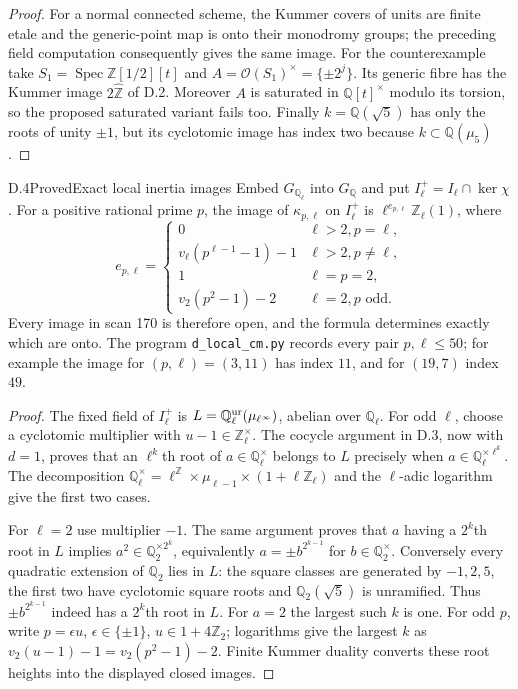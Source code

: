 \begin{proof}
For a normal connected scheme, the Kummer covers of units are finite etale and the generic-point map is onto their monodromy groups; the preceding field computation consequently gives the same image. For the counterexample take $S_1=\operatorname{Spec}\mathbb Z[1/2][t]$ and $A=\mathcal O(S_1)^\times=\{\pm2^j\}$. Its generic fibre has the Kummer image $2\widehat{\mathbb Z}$ of D.2. Moreover $A$ is saturated in $\mathbb Q[t]^\times$ modulo its torsion, so the proposed saturated variant fails too. Finally $k=\mathbb Q(\sqrt5)$ has only the roots of unity $\pm1$, but its cyclotomic image has index two because $k\subset\mathbb Q(\mu_5)$.
\end{proof}

\begin{statement}{D.4}{Proved}{Exact local inertia images}
Embed $G_{\mathbb Q_\ell}$ into $G_{\mathbb Q}$ and put $I_\ell^+=I_\ell\cap\ker\chi$. For a positive rational prime $p$, the image of $\kappa_{p,\ell}$ on $I_\ell^+$ is $\ell^{e_{p,\ell}}\mathbb Z_\ell(1)$, where
\[
 e_{p,\ell}=\begin{cases}
 0&\ell>2, p=\ell,\\
 v_\ell(p^{\ell-1}-1)-1&\ell>2, p\ne\ell,\\
 1&\ell=p=2,\\
 v_2(p^2-1)-2&\ell=2, p\text{ odd}.
 \end{cases}                                               \tag{D.4}
\]
Every image in scan 170 is therefore open, and the formula determines exactly which are onto. The program \texttt{d\_local\_cm.py} records every pair $p,\ell\leq50$; for example the image for $(p,\ell)=(3,11)$ has index $11$, and for $(19,7)$ index $49$.
\end{statement}
\begin{proof}
The fixed field of $I_\ell^+$ is $L=\mathbb Q_\ell^{\rm ur}(\mu_{\ell^\infty})$, abelian over $\mathbb Q_\ell$. For odd $\ell$, choose a cyclotomic multiplier with $u-1\in\mathbb Z_\ell^\times$. The cocycle argument in D.3, now with $d=1$, proves that an $\ell^k$th root of $a\in\mathbb Q_\ell^\times$ belongs to $L$ precisely when $a\in\mathbb Q_\ell^{\times\ell^k}$. The decomposition
$\mathbb Q_\ell^\times=\ell^{\mathbb Z}\times\mu_{\ell-1}\times(1+\ell\mathbb Z_\ell)$ and the $\ell$-adic logarithm give the first two cases.

For $\ell=2$ use multiplier $-1$. The same argument proves that $a$ having a $2^k$th root in $L$ implies $a^2\in\mathbb Q_2^{\times2^k}$, equivalently $a=\pm b^{2^{k-1}}$ for $b\in\mathbb Q_2^\times$. Conversely every quadratic extension of $\mathbb Q_2$ lies in $L$: the square classes are generated by $-1,2,5$, the first two have cyclotomic square roots and $\mathbb Q_2(\sqrt5)$ is unramified. Thus $\pm b^{2^{k-1}}$ indeed has a $2^k$th root in $L$. For $a=2$ the largest such $k$ is one. For odd $p$, write $p=\epsilon u$, $\epsilon\in\{\pm1\}$, $u\in1+4\mathbb Z_2$; logarithms give the largest $k$ as $v_2(u-1)-1=v_2(p^2-1)-2$. Finite Kummer duality converts these root heights into the displayed closed images.
\end{proof}

